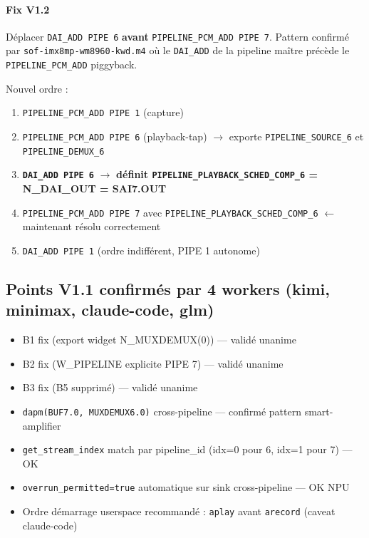 \documentclass[11pt,a4paper]{article}
\begin{document}
\paragraph{Fix V1.2} Déplacer \texttt{DAI\_ADD PIPE 6} \textbf{avant} \texttt{PIPELINE\_PCM\_ADD PIPE 7}. Pattern confirmé par \texttt{sof-imx8mp-wm8960-kwd.m4} où le \texttt{DAI\_ADD} de la pipeline maître précède le \texttt{PIPELINE\_PCM\_ADD} piggyback.

Nouvel ordre :
\begin{enumerate}[leftmargin=*, itemsep=1pt]
  \item \texttt{PIPELINE\_PCM\_ADD PIPE 1} (capture)
  \item \texttt{PIPELINE\_PCM\_ADD PIPE 6} (playback-tap) $\to$ exporte \texttt{PIPELINE\_SOURCE\_6} et \texttt{PIPELINE\_DEMUX\_6}
  \item \textbf{\texttt{DAI\_ADD PIPE 6}} $\to$ \textbf{définit \texttt{PIPELINE\_PLAYBACK\_SCHED\_COMP\_6} = N\_DAI\_OUT = SAI7.OUT}
  \item \texttt{PIPELINE\_PCM\_ADD PIPE 7} avec \texttt{PIPELINE\_PLAYBACK\_SCHED\_COMP\_6} $\leftarrow$ maintenant résolu correctement
  \item \texttt{DAI\_ADD PIPE 1} (ordre indifférent, PIPE 1 autonome)
\end{enumerate}

\subsection{Points V1.1 confirmés par 4 workers (kimi, minimax, claude-code, glm)}

\begin{itemize}[leftmargin=*, itemsep=1pt]
  \item B1 fix (export widget N\_MUXDEMUX(0)) — validé unanime
  \item B2 fix (W\_PIPELINE explicite PIPE 7) — validé unanime
  \item B3 fix (B5 supprimé) — validé unanime
  \item \texttt{dapm(BUF7.0, MUXDEMUX6.0)} cross-pipeline — confirmé pattern smart-amplifier
  \item \texttt{get\_stream\_index} match par pipeline\_id (idx=0 pour 6, idx=1 pour 7) — OK
  \item \texttt{overrun\_permitted=true} automatique sur sink cross-pipeline — OK NPU
  \item Ordre démarrage userspace recommandé : \texttt{aplay} avant \texttt{arecord} (caveat claude-code)
\end{itemize}
\end{document}
